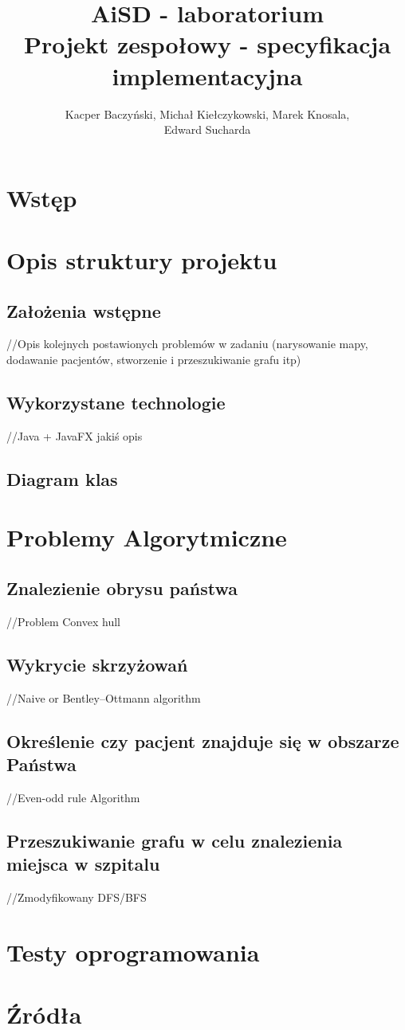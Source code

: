 \documentclass[10pt,a4paper]{article}
\title{\huge AiSD - laboratorium \\ \Large Projekt zespołowy - specyfikacja implementacyjna}
\author{Kacper Baczyński, Michał Kiełczykowski, Marek Knosala, \\ Edward Sucharda}
\begin{document}
\maketitle

\section{Wstęp}

\section{Opis struktury projektu}

\subsection{Założenia wstępne}

//Opis kolejnych postawionych problemów w zadaniu (narysowanie mapy, dodawanie pacjentów, stworzenie i przeszukiwanie grafu itp)

\subsection{Wykorzystane technologie}

//Java + JavaFX jakiś opis

\subsection{Diagram klas}

\section{Problemy Algorytmiczne}

\subsection{Znalezienie obrysu państwa}

//Problem Convex hull

\subsection{Wykrycie skrzyżowań}

//Naive or Bentley–Ottmann algorithm

\subsection{Określenie czy pacjent znajduje się w obszarze Państwa}

//Even-odd rule Algorithm

\subsection{Przeszukiwanie grafu w celu znalezienia miejsca w szpitalu}

//Zmodyfikowany DFS/BFS

\section{Testy oprogramowania}


\section{Źródła}
\end{document}
